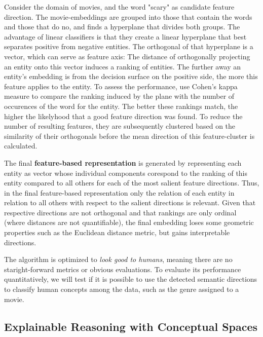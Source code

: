 Consider the domain of movies, and the word "scary" as candidate feature direction. The movie-embeddings are grouped into those that contain the words and those that do no, and finds a hyperplane that divides both groups. The advantage of linear classifiers is that they create a linear hyperplane that best separates positive from negative entities. The orthogonal of that hyperplane is a vector, which can serve as feature axis: The distance of orthogonally projecting an entity onto this vector induces a ranking of entities. The further away an entity's embedding is from the decision surface on the positive side, the more this feature applies to the entity. To assess the performance, \cite{Derrac2015} use Cohen's kappa measure to compare the ranking induced by the plane with the number of occurences of the word for the entity. The better these rankings match, the higher the likelyhood that a good feature direction was found. To reduce the number of resulting features, they are subsequently clustered based on the similarity of their orthogonals before the mean direction of this feature-cluster is calculated. 

The final \textbf{feature-based representation} is generated by representing each entity as vector whose individual components corespond to the ranking of this entity compared to all others for each of the most salient feature directions. Thus, in the final feature-based representation only the relation of each entity in relation to all others with respect to the salient directions is relevant. Given that respective directions are not orthogonal \cite[22]{Derrac2015} and that rankings are only ordinal (where distances are not quantifiable), the final embedding loses some geometric properties such as the Euclidean distance metric, but gains interpretable directions.

The algorithm is optimized to \textit{look good to humans}, meaning there are no staright-forward metrics or obvious evaluations. To evaluate its performance quantitatively, we will test if it is possible to use the detected semantic directions to classify human concepts among the data, such as the genre assigned to a movie.



\subsection{Explainable Reasoning with Conceptual Spaces}
\label{sec:reasoning}

